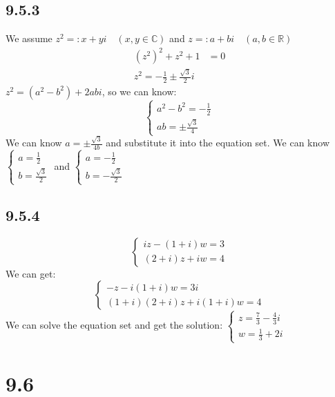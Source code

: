 \documentclass[11pt,twoside,a4paper]{article}
\begin{document}
\subsection{9.5.3}
We assume $z^2=:x+yi\quad (x,y\in \mathbb{C})$ and $z=:a+bi\quad (a,b\in \mathbb{R})$
\begin{equation}
    \begin{aligned}
        (z^2)^2+z^2+1&=0\\
        z^2=-\frac{1}{2}\pm \frac{\sqrt{3}}{2}i
    \end{aligned}
\end{equation}
$z^2=(a^2-b^2)+2abi$, so we can know:
$$
\begin{cases}
    a^2-b^2=-\frac{1}{2}\\
    ab=\pm \frac{\sqrt{3}}{4}
\end{cases}
$$
We can know $\displaystyle a=\pm\frac{\sqrt{3}}{4b}$ and substitute it into the 
equation set. We can know 
$
\begin{cases}
    \displaystyle
    a=\frac{1}{2}\\
    \displaystyle
    b=\frac{\sqrt{3}}{2}
\end{cases}
$
and 
$
\begin{cases}
    \displaystyle
    a=-\frac{1}{2}\\
    \displaystyle
    b=-\frac{\sqrt{3}}{2}
\end{cases}
$

\subsection{9.5.4}
$$
\begin{cases}
    iz-(1+i)w=3\\
    (2+i)z+iw=4
\end{cases}
$$
We can get:
$$
\begin{cases}
    -z-i(1+i)w=3i\\
    (1+i)(2+i)z+i(1+i)w=4
\end{cases}
$$
We can solve the equation set and get the solution:
$
\begin{cases}
    \displaystyle
    z=\frac{7}{3}-\frac{4}{3}i\\
    \displaystyle
    w=\frac{1}{3}+2i
\end{cases}
$

\section{9.6}
\end{document}
